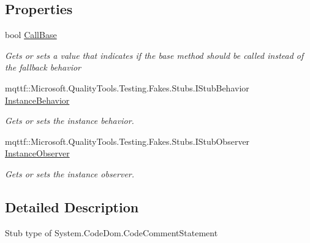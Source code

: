 \subsection*{Properties}
\begin{DoxyCompactItemize}
\item 
bool \hyperlink{class_system_1_1_code_dom_1_1_fakes_1_1_stub_code_comment_statement_a7391ee85ca06c2cdab1a847ccf42c270}{Call\-Base}
\begin{DoxyCompactList}\small\item\em Gets or sets a value that indicates if the base method should be called instead of the fallback behavior\end{DoxyCompactList}\item 
mqttf\-::\-Microsoft.\-Quality\-Tools.\-Testing.\-Fakes.\-Stubs.\-I\-Stub\-Behavior \hyperlink{class_system_1_1_code_dom_1_1_fakes_1_1_stub_code_comment_statement_afc5779cea7da7aacd3ccb84a1b7ba85d}{Instance\-Behavior}
\begin{DoxyCompactList}\small\item\em Gets or sets the instance behavior.\end{DoxyCompactList}\item 
mqttf\-::\-Microsoft.\-Quality\-Tools.\-Testing.\-Fakes.\-Stubs.\-I\-Stub\-Observer \hyperlink{class_system_1_1_code_dom_1_1_fakes_1_1_stub_code_comment_statement_a379f7f98b47948bdb2f8f0cb0524e29f}{Instance\-Observer}
\begin{DoxyCompactList}\small\item\em Gets or sets the instance observer.\end{DoxyCompactList}\end{DoxyCompactItemize}


\subsection{Detailed Description}
Stub type of System.\-Code\-Dom.\-Code\-Comment\-Statement



